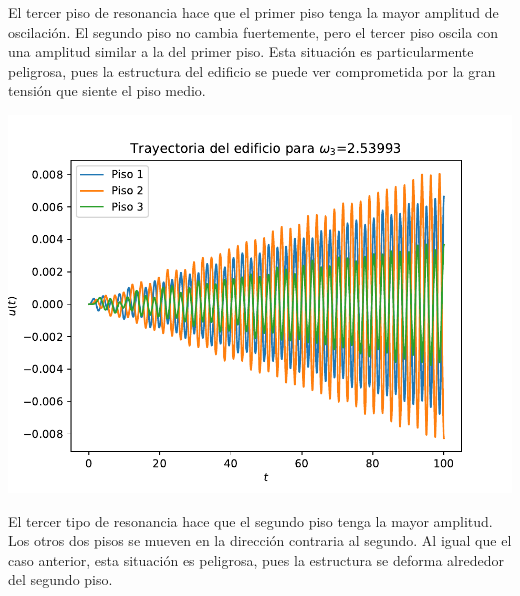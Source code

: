 \documentclass[11pt,letterpaper]{exam}
\begin{document}
El tercer piso de resonancia hace que el primer piso tenga la mayor amplitud de oscilación. El segundo piso no cambia fuertemente, pero el tercer piso oscila con una amplitud similar a la del primer piso. Esta situación es particularmente peligrosa, pues la estructura del edificio se puede ver comprometida por la gran tensión que siente el piso medio.
\begin{center}
\includegraphics[width=14cm]{3_Edificio_omega3.pdf}
\end{center}
El tercer tipo de resonancia hace que el segundo piso tenga la mayor amplitud. Los otros dos pisos se mueven en la dirección contraria al segundo. Al igual que el caso anterior, esta situación es peligrosa, pues la estructura se deforma alrededor del segundo piso.
\end{document}
